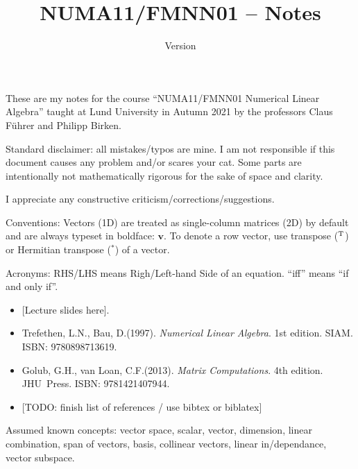 \documentclass[
  12pt,
  paper=a4,
]{scrartcl} %
\title{NUMA11/FMNN01 -- Notes}
\author{\studentname}
\date{\footnotesize{Version \texttt{\thisdocversion}}}
\begin{document}

\maketitle
\vspace*{-2.5em}

These are my notes for the course ``NUMA11/FMNN01 Numerical Linear Algebra'' taught at Lund University in Autumn 2021 by the professors Claus Führer and Philipp Birken.


Standard disclaimer: all mistakes/typos are mine. I am not responsible if this document causes any problem and/or scares your cat. Some parts are intentionally not mathematically rigorous for the sake of space and clarity.

I appreciate any constructive criticism/corrections/suggestions.

Conventions: Vectors (1D) are treated as single-column matrices (2D) by default and are always typeset in boldface: $\bm v$. To denote a row vector, use transpose ($^{\mathrm{T}}$) or Hermitian transpose ($^*$) of a vector.

Acronyms: RHS/LHS means Righ/Left-hand Side of an equation. ``iff'' means ``if and only if''.


\begin{itemize}
    \item {} [Lecture slides here].
    
    \item Trefethen, L.\@ N., Bau, D.\@ (1997). \emph{Numerical Linear Algebra}. 1st edition. SIAM. ISBN: 9780898713619.
    \item Golub, G.\@ H., van Loan, C.\@ F.\@ (2013). \emph{Matrix Computations}. 4th edition. JHU~Press. ISBN: 9781421407944.
    \item {} [TODO: finish list of references / use bibtex or biblatex]
\end{itemize}

\newpage
{}
Assumed known concepts: vector space, scalar, vector, dimension, linear combination, span of vectors, basis, collinear vectors, linear in/dependance, vector subspace.%
\end{document}
